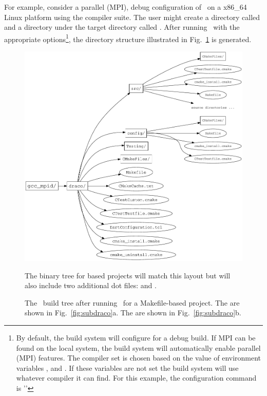 
For example, consider a parallel (MPI), debug configuration of \draco\ on a x86\_64 Linux
platform using the  compiler suite.  The user might create a  directory called
 and a  directory under the target directory called . After running \cmake\ with the
appropriate options\footnote{By default, the build system will configure for a debug build.  If MPI can be found on the local system, the build system will automatically enable parallel (MPI) features. The compiler set is chosen based on the value of environment variables ,  and .  If these variables are not set the build system will use whatever compiler it can find.  For this example, the configuration command is ''},
the directory structure illustrated in Fig.~\ref{fig:build_tree} is generated.
\begin{figure}
  \centerline{\includegraphics[width=6in]{fig/build_tree}}
  \caption{The \draco\ build tree after running \cmake\ for a Makefile-based project.  The  are shown in
    Fig.~\ref{fig:subdraco}a. The  are shown in
    Fig.~\ref{fig:subdraco}b.}  The binary tree for  based projects will match this layout but will also include two additional dot files:  and .
  \label{fig:build_tree}
\end{figure}
